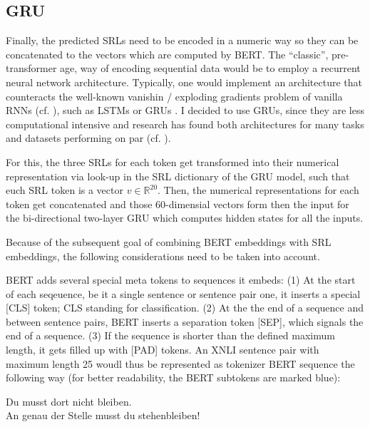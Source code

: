 \subsection{GRU}

Finally, the predicted SRLs need to be encoded in a numeric way so they can be concatenated to
the vectors which are computed by BERT. The ``classic'', pre-transformer age, way of encoding
sequential data would be to employ a recurrent neural network architecture. Typically, one would
implement an architecture that counteracts the well-known vanishin / exploding gradients problem
of vanilla RNNs (cf. \citep{bengio1994learning}), such as LSTMs \citep{hochreiter1997long} or
GRUs \citep{cho2014learning}. I decided to use GRUs, since they are less computational intensive
and research has found both architectures for many tasks and datasets performing on par (cf.
\cite{chung2014empirical}).

For this, the three SRLs for each token get transformed into their numerical representation
via look-up in the SRL dictionary of the GRU model, such that euch SRL token is a vector $v \in
\mathbb{R}^{20}$. Then, the numerical representations for each token get concatenated and
those 60-dimensial vectors form then the input for the bi-directional two-layer GRU which
computes hidden states for all the inputs.

Because of the subsequent goal of combining BERT embeddings with SRL embeddings, the following
considerations need to be taken into account.


BERT adds several special meta tokens to sequences it embeds: (1) At the start of each
seqeuence, be it a single sentence or sentence pair one, it inserts a special [CLS] token; CLS
standing for classification. (2) At the the end of a sequence and between sentence pairs, BERT
inserts a separation token [SEP], which signals the end of a sequence. (3) If the sequence
is shorter than the defined maximum length, it gets filled up with [PAD] tokens. An XNLI sentence
pair with maximum length 25 woudl thus be represented as tokenizer BERT sequence the following
way (for better readability, the BERT subtokens are marked blue):

\begin{examples}
  \item Du musst dort nicht bleiben.\\
        An genau der Stelle musst du stehenbleiben!

                                    
\end{examples}

